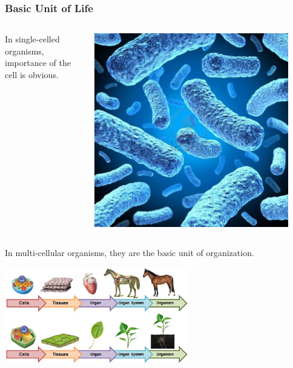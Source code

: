 \documentclass[10pt]{beamer}
\begin{document}
\begin{frame}[t]	
\frametitle{Basic Unit of Life}

	\begin{columns}
		\begin{column}{0.8\textwidth}
			In single-celled organisms, importance of the cell is obvious.
		\end{column}
		
		\begin{column}{0.2\textwidth}
			\begin{center}
				\includegraphics[width=0.9\textwidth]{figures/bacteria.jpg}\\
			\end{center}
		\end{column}
	\end{columns}
	
	\vspace{1.0cm}
	
	In multi-cellular organisms, they are the basic unit of organization.
	
		\begin{center}
			\includegraphics[width=0.6\textwidth]{figures/systems.jpg}
		\end{center}
\end{frame}
\end{document}
